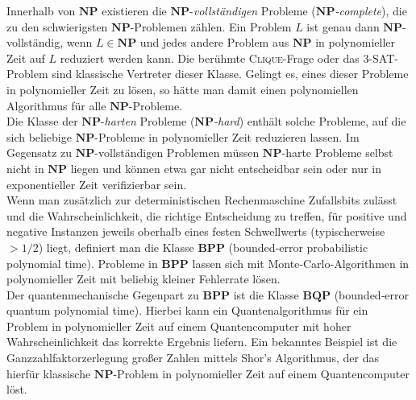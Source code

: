 Innerhalb von \(\mathbf{NP}\) existieren die \(\mathbf{NP}\)-\emph{vollständigen} Probleme (\(\mathbf{NP}\)\emph{-complete}), die zu den schwierigsten \(\mathbf{NP}\)-Problemen zählen. Ein Problem \(L\) ist genau dann \(\mathbf{NP}\)-vollständig, wenn \(L\in\mathbf{NP}\) und jedes andere Problem aus \(\mathbf{NP}\) in polynomieller Zeit auf \(L\) reduziert werden kann. Die berühmte \textsc{Clique}-Frage oder das \textsc{3-SAT}-Problem sind klassische Vertreter dieser Klasse. Gelingt es, eines dieser Probleme in polynomieller Zeit zu lösen, so hätte man damit einen polynomiellen Algorithmus für alle \(\mathbf{NP}\)-Probleme.\\

Die Klasse der \(\mathbf{NP}\)-\emph{harten} Probleme (\(\mathbf{NP}\)\emph{-hard}) enthält solche Probleme, auf die sich beliebige \(\mathbf{NP}\)-Probleme in polynomieller Zeit reduzieren lassen. Im Gegensatz zu \(\mathbf{NP}\)-vollständigen Problemen müssen \(\mathbf{NP}\)-harte Probleme selbst nicht in \(\mathbf{NP}\) liegen und können etwa gar nicht entscheidbar sein oder nur in exponentieller Zeit verifizierbar sein.\\

Wenn man zusätzlich zur deterministischen Rechenmaschine Zufallsbits zulässt und die Wahrscheinlichkeit, die richtige Entscheidung zu treffen, für positive und negative Instanzen jeweils oberhalb eines festen Schwellwerts (typischerweise \(>1/2\)) liegt, definiert man die Klasse \(\mathbf{BPP}\) (bounded‑error probabilistic polynomial time). Probleme in \(\mathbf{BPP}\) lassen sich mit Monte‑Carlo‑Algorithmen in polynomieller Zeit mit beliebig kleiner Fehlerrate lösen.\\

Der quantenmechanische Gegenpart zu \(\mathbf{BPP}\) ist die Klasse \(\mathbf{BQP}\) (bounded‑error quantum polynomial time). Hierbei kann ein Quantenalgorithmus für ein Problem in polynomieller Zeit auf einem Quantencomputer mit hoher Wahrscheinlichkeit das korrekte Ergebnis liefern. Ein bekanntes Beispiel ist die Ganzzahlfaktorzerlegung großer Zahlen mittels Shor’s Algorithmus, der das hierfür klassische \(\mathbf{NP}\)-Problem in polynomieller Zeit auf einem Quantencomputer löst.

